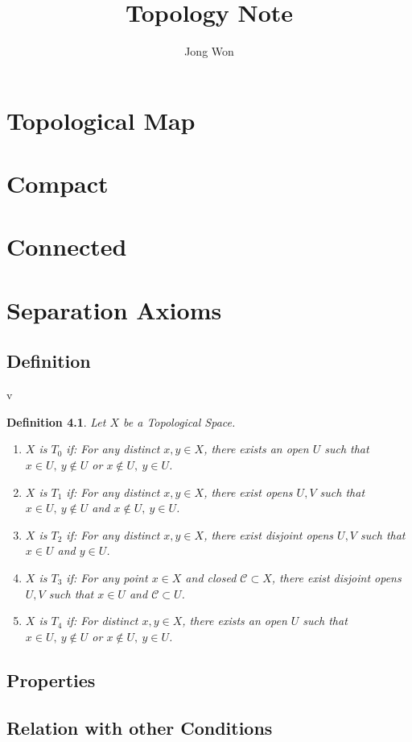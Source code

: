 \documentclass[8pt]{report}
\title{Topology Note}
\author{Jong Won}
\affil{University of Seoul, Mathematics}
\date{}
\theoremstyle{romanstyle}
\newtheorem{definition}{Definition}
\begin{document}
\maketitle

\newpage
\tableofcontents %
\vspace{3cm}

\chapter{Topological Map}
\chapter{Compact}
\chapter{Connected}

\chapter{Separation Axioms}
\section{Definition} v
\begin{definition}
    Let $X$ be a Topological Space.
    \begin{enumerate}
        \item $X$ is $T_0$ if: For any distinct $x,y \in X$, there exists an open $U$ such that $x \in U,\ y \notin U$ or $x \notin U,\ y \in U$.
        \item $X$ is $T_1$ if: For any distinct $x,y \in X$, there exist opens $U,V$ such that $x \in U,\ y \notin U$ and $x \notin U,\ y \in U$.
        \item $X$ is $T_2$ if: For any distinct $x,y \in X$, there exist disjoint opens $U,V$ such that $x \in U$ and $y \in U$.
        \item $X$ is $T_3$ if: For any point $x \in X$ and closed $\mathcal{C} \subset X$, there exist disjoint opens $U,V$ such that $x \in U$ and $\mathcal{C} \subset U$.
        \item $X$ is $T_4$ if: For distinct $x,y \in X$, there exists an open $U$ such that $x \in U,\ y \notin U$ or $x \notin U,\ y \in U$.
    \end{enumerate}
\end{definition}
\section{Properties}
\section{Relation with other Conditions}
\end{document}
